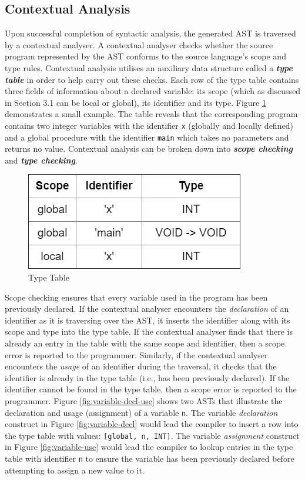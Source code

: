 \documentclass{l4proj}
\begin{document}
\subsection{Contextual Analysis}
Upon successful completion of syntactic analysis, the generated AST is traversed  by a contextual analyser. A contextual analyser checks whether the source program represented by the AST conforms to the source language's scope and type rules. Contextual analysis utilises an auxiliary data structure called a \textit{\textbf{type table}} in order to help carry out these checks. Each row of the type table contains three fields of information about a declared variable: its scope (which as discussed in Section 3.1 can be local or global), its identifier and its type. Figure \ref{fig:type-table} demonstrates a small example. The table reveals that the corresponding program contains two integer variables with the identifier \texttt{x} (globally and locally defined) and a global procedure with the identifier \texttt{main} which takes no parameters and returns no value. Contextual analysis can be broken down into \textit{\textbf{scope checking}} and \textit{\textbf{type checking}}.

\begin{figure}[h]
\centering
\includegraphics[scale=0.5]{images/type-table.png}
\caption{Type Table}
\label{fig:type-table}	
\end{figure}

Scope checking ensures that every variable used in the program has been previously declared. If the contextual analyser encounters the \textit{declaration} of an identifier as it is traversing over the AST, it inserts the identifier along with its scope and type into the type table. If the contextual analyser finds that there is already an entry in the table with the same scope and identifier, then a scope error is reported to the programmer. Similarly, if the contextual analyser encounters the \textit{usage} of an identifier during the traversal, it checks that the identifier is already in the type table (i.e., has been previously declared). If the identifier cannot be found in the type table, then a scope error is reported to the programmer. Figure \ref{fig:variable-decl-use} shows two ASTs that illustrate the declaration and usage (assignment) of a variable \texttt{n}. The variable \textit{declaration} construct in Figure \ref{fig:variable-decl} would lead the compiler to insert a row into the type table with values: \texttt{[global, n, INT]}. The variable \textit{assignment} construct in Figure \ref{fig:variable-use} would lead the compiler to lookup entries in the type table with identifier \texttt{n} to ensure the variable has been previously declared before attempting to assign a new value to it.
\end{document}
